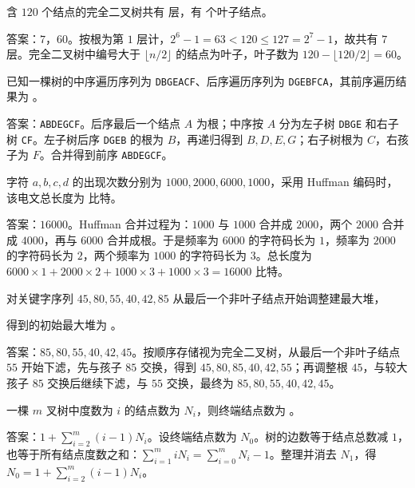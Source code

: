\begin{question}
含 $120$ 个结点的完全二叉树共有 \blank 层，有 \blank 个叶子结点。
\begin{solution}
答案：$7$，$60$。按根为第 $1$ 层计，$2^6-1=63<120\le 127=2^7-1$，故共有 $7$ 层。完全二叉树中编号大于 $\lfloor n/2\rfloor$ 的结点为叶子，叶子数为 $120-\lfloor120/2\rfloor=60$。
\end{solution}
\end{question}

\begin{question}
已知一棵树的中序遍历序列为 \texttt{DBGEACF}、后序遍历序列为 \texttt{DGEBFCA}，其前序遍历结果为 \blank。
\begin{solution}
答案：\texttt{ABDEGCF}。后序最后一个结点 $A$ 为根；中序按 $A$ 分为左子树 \texttt{DBGE} 和右子树 \texttt{CF}。左子树后序 \texttt{DGEB} 的根为 $B$，再递归得到 $B,D,E,G$；右子树根为 $C$，右孩子为 $F$。合并得到前序 \texttt{ABDEGCF}。
\end{solution}
\end{question}

\begin{question}
字符 $a,b,c,d$ 的出现次数分别为 $1000,2000,6000,1000$，采用 Huffman 编码时，该电文总长度为 \blank 比特。
\begin{solution}
答案：$16000$。Huffman 合并过程为：$1000$ 与 $1000$ 合并成 $2000$，两个 $2000$ 合并成 $4000$，再与 $6000$ 合并成根。于是频率为 $6000$ 的字符码长为 $1$，频率为 $2000$ 的字符码长为 $2$，两个频率为 $1000$ 的字符码长为 $3$。总长度为 $6000\times1+2000\times2+1000\times3+1000\times3=16000$ 比特。
\end{solution}
\end{question}

\begin{question}
对关键字序列 $45,80,55,40,42,85$ 从最后一个非叶子结点开始调整建最大堆，\par
得到的初始最大堆为 \blank。
\begin{solution}
答案：$85,80,55,40,42,45$。按顺序存储视为完全二叉树，从最后一个非叶子结点 $55$ 开始下滤，先与孩子 $85$ 交换，得到 $45,80,85,40,42,55$；再调整根 $45$，与较大孩子 $85$ 交换后继续下滤，与 $55$ 交换，最终为 $85,80,55,40,42,45$。
\end{solution}
\end{question}

\begin{question}
一棵 $m$ 叉树中度数为 $i$ 的结点数为 $N_i$，则终端结点数为 \blank。
\begin{solution}
答案：$1+\sum_{i=2}^{m}(i-1)N_i$。设终端结点数为 $N_0$。树的边数等于结点总数减 $1$，也等于所有结点度数之和：$\sum_{i=1}^{m} iN_i = \sum_{i=0}^{m}N_i-1$。整理并消去 $N_1$，得 $N_0=1+\sum_{i=2}^{m}(i-1)N_i$。
\end{solution}
\end{question}

